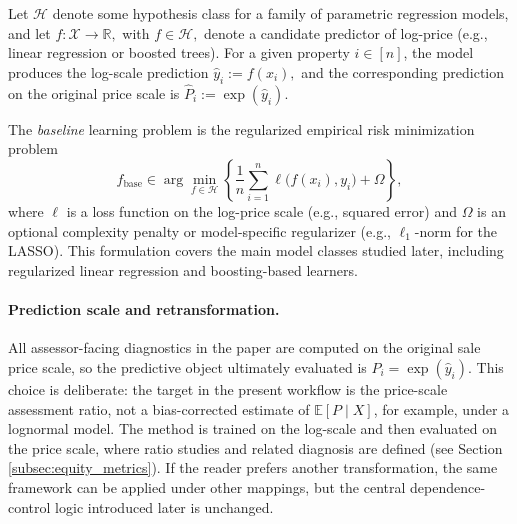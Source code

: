 \documentclass[12pt, draft]{article}
\theoremstyle{plain}
\theoremstyle{definition}
\newcommand{\E}{\mathbb{E}}
\newcommand{\1}{\mathbf{1}}
\renewcommand{\H}{\mathcal{H}}
\begin{document}
{Let $\H$ denote some hypothesis class for a family of parametric regression models, and let
$
f:\mathcal{X}\to\mathbb{R},
$ with $ f \in \H,
$
denote a candidate predictor of log-price (e.g., linear regression or boosted trees). For a given property $i\in [n]$, the model produces the log-scale prediction
$
\hat y_i := f(x_i),
$
and the corresponding prediction on the original price scale is
$
\widehat P_i := \exp(\hat y_i).
$

The \textit{baseline} learning problem is the regularized empirical risk minimization problem
\begin{equation}
\label{eq:baseline_erm}
f_\mathrm{base}
\in
\arg\min_{f\in\H}
\left\{
\frac{1}{n}\sum_{i=1}^n \ell\big(f(x_i),y_i\big)
+
\Omega
\right\}
,
\end{equation}
where $\ell$ is a loss function on the log-price scale (e.g., squared error) and $\Omega$ is an optional complexity penalty or model-specific regularizer (e.g., $\ell_1$-norm for the LASSO). This formulation covers the main model classes studied later, including regularized linear regression and boosting-based learners.

\paragraph{Prediction scale and retransformation.}
All assessor-facing diagnostics in the paper are computed on the original sale price scale, so the predictive object ultimately evaluated is \(\widehat P_i=\exp(\hat y_i)\). This choice is deliberate: the target in the present workflow is the price-scale assessment ratio, not a bias-corrected estimate of \(\E[P\mid X]\), for example, under a lognormal model. The method is trained on the log-scale and then evaluated on the price scale, where ratio studies and related diagnosis are defined (see Section \ref{subsec:equity_metrics}). If the reader prefers another transformation, the same framework can be applied under other mappings, but the central dependence-control logic introduced later is unchanged.

}
\end{document}

